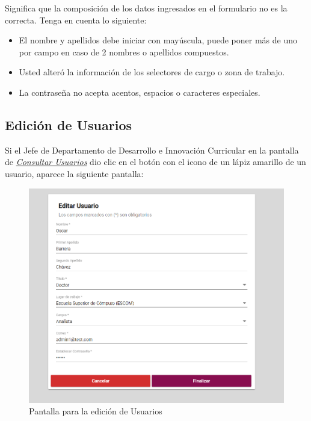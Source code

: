 \begin{itemize}
                        Significa que la composición de los datos ingresados en el formulario no es la correcta. Tenga en cuenta lo siguiente:

                        \begin{itemize}
                            \item El nombre y apellidos debe iniciar con mayúscula, puede poner más de uno por campo en caso de 2 nombres o apellidos compuestos.
                            \item Usted alteró la información de los selectores de cargo o zona de trabajo.
                            \item La contraseña no acepta acentos, espacios o caracteres especiales.
                        \end{itemize}

                \end{itemize}

\newpage

            \hypertarget{editar-user}{}
            \subsection{Edición de Usuarios}
                Si el Jefe de Departamento de Desarrollo e Innovación Curricular en la pantalla de \hyperlink{consultarUs}{\textit{Consultar Usuarios}} dio clic en el botón con el icono de un lápiz amarillo de un usuario, aparece la siguiente pantalla:

                \begin{figure}[!hbtp]
                    \centering
                    \hypertarget{editarUs}{\includegraphics[width=0.6\linewidth]{images/SP5/Editar-Usuario}}
                    \caption{Pantalla para la edición de Usuarios}
                    \label{editarrh}
                \end{figure}

